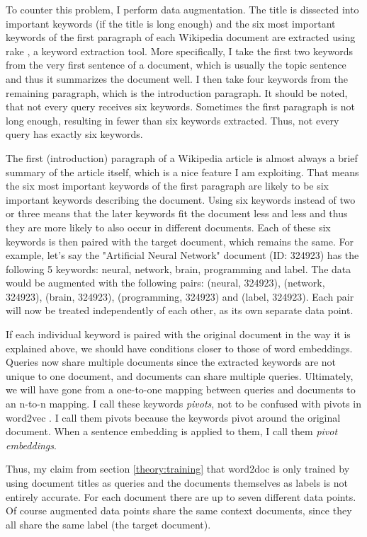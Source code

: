 To counter this problem, I perform data augmentation. The title is dissected into important keywords (if the title is
long enough) and the six most important keywords of the first paragraph of each Wikipedia document are extracted using rake
\citep{rake}, a keyword extraction tool. More specifically, I take the first two keywords from the very first sentence of a
document, which is usually the topic sentence and thus it summarizes the document well. I then take four keywords from the remaining
paragraph, which is the introduction paragraph. It should be noted, that not every query receives six keywords. Sometimes the first
paragraph is not long enough, resulting in fewer than six keywords extracted. Thus, not every query has exactly six keywords.

The first (introduction) paragraph of a Wikipedia article is almost always a brief summary of the article itself, which is a nice
feature I am exploiting. That means the six most important keywords of the first paragraph are likely to be
six important keywords describing the document. Using six keywords instead of two or three means that the later keywords fit the
document less and less and thus they are more likely to also occur in different documents. Each of these six keywords is then
paired with the target document, which remains the same. For example, let's say the "Artificial Neural Network" document (ID: 324923)
has the following 5 keywords: neural, network, brain, programming and label. The data would be augmented with the following pairs:
(neural, 324923), (network, 324923), (brain, 324923), (programming, 324923) and (label, 324923). Each pair will now be treated
independently of each other, as its own separate data point.

If each individual keyword is paired with the original document in the way it is explained above, we should have conditions closer
to those of word embeddings. Queries now share multiple documents since the extracted keywords are not unique to one document, and
documents can share multiple queries. Ultimately, we will have gone from a one-to-one mapping between queries and documents to
an n-to-n mapping. I call these keywords \textit{pivots}, not to be confused with pivots in word2vec \citep{word2vec}. I call them
pivots because the keywords pivot around the original document. When a sentence embedding is applied to them, I call
them \textit{pivot embeddings}.

Thus, my claim from section \ref{theory:training} that word2doc is only trained by using document titles as queries and the documents
themselves as labels is not entirely accurate. For each document there are up to seven different data points. Of course augmented
data points share the same context documents, since they all share the same label (the target document).

